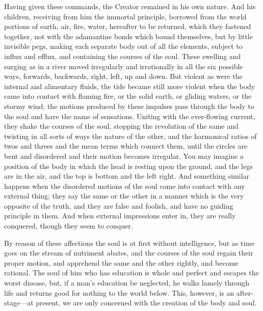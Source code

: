 \documentclass[11pt,letter]{article}
\begin{document}
\par  Having given these commands, the Creator remained in his own nature. And his children, receiving from him the immortal principle, borrowed from the world portions of earth, air, fire, water, hereafter to be returned, which they fastened together, not with the adamantine bonds which bound themselves, but by little invisible pegs, making each separate body out of all the elements, subject to influx and efflux, and containing the courses of the soul. These swelling and surging as in a river moved irregularly and irrationally in all the six possible ways, forwards, backwards, right, left, up and down. But violent as were the internal and alimentary fluids, the tide became still more violent when the body came into contact with flaming fire, or the solid earth, or gliding waters, or the stormy wind; the motions produced by these impulses pass through the body to the soul and have the name of sensations. Uniting with the ever-flowing current, they shake the courses of the soul, stopping the revolution of the same and twisting in all sorts of ways the nature of the other, and the harmonical ratios of twos and threes and the mean terms which connect them, until the circles are bent and disordered and their motion becomes irregular. You may imagine a position of the body in which the head is resting upon the ground, and the legs are in the air, and the top is bottom and the left right. And something similar happens when the disordered motions of the soul come into contact with any external thing; they say the same or the other in a manner which is the very opposite of the truth, and they are false and foolish, and have no guiding principle in them. And when external impressions enter in, they are really conquered, though they seem to conquer.

\par  By reason of these affections the soul is at first without intelligence, but as time goes on the stream of nutriment abates, and the courses of the soul regain their proper motion, and apprehend the same and the other rightly, and become rational. The soul of him who has education is whole and perfect and escapes the worst disease, but, if a man’s education be neglected, he walks lamely through life and returns good for nothing to the world below. This, however, is an after-stage—at present, we are only concerned with the creation of the body and soul.
\end{document}
